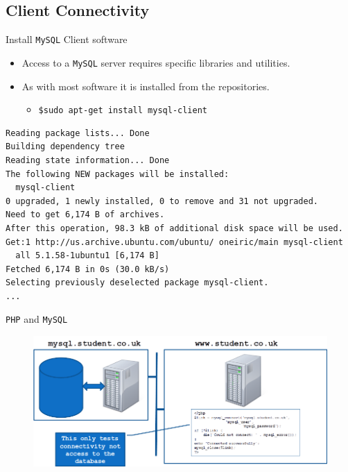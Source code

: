 \documentclass[xcolor=table,aspectratio=169]{beamer}
\begin{document}
\subsection{Client Connectivity}
\begin{frame}[fragile]{Install \texttt{MySQL} Client software}
  \begin{itemize}
    \item Access to a \texttt{MySQL} server requires specific libraries and utilities.
    \item As with most software it is installed from the repositories.
      \begin{itemize}
        \item \texttt{\$sudo apt-get install mysql-client}
      \end{itemize}
  \end{itemize}
  \begin{tcolorbox}
    \lstset{
      basicstyle=\tiny\ttfamily,
    }
    \begin{lstlisting}
Reading package lists... Done
Building dependency tree
Reading state information... Done
The following NEW packages will be installed:
  mysql-client
0 upgraded, 1 newly installed, 0 to remove and 31 not upgraded.
Need to get 6,174 B of archives.
After this operation, 98.3 kB of additional disk space will be used.
Get:1 http://us.archive.ubuntu.com/ubuntu/ oneiric/main mysql-client 
  all 5.1.58-1ubuntu1 [6,174 B]
Fetched 6,174 B in 0s (30.0 kB/s)
Selecting previously deselected package mysql-client.
...
    \end{lstlisting}
  \end{tcolorbox}
\end{frame}

\begin{frame}{\texttt{PHP} and \texttt{MySQL}}
  \begin{figure}
    \begin{center}
      \includegraphics[width=1\linewidth]{Connectivity.png}
    \end{center}
  \end{figure}
\end{frame}
\end{document}
